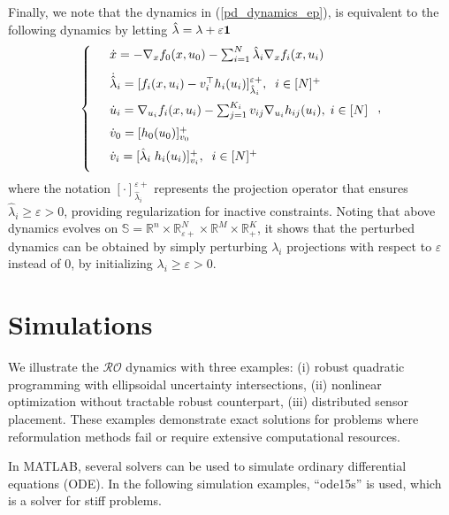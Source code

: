 \documentclass[journal,twoside,web]{ieeecolor}
\newcommand{\rev}[1]{\textcolor{revisionblue}{#1}}
\begin{document}
Finally, we note that the dynamics in (\ref{pd_dynamics_ep}), is equivalent to the following dynamics by letting $\hat{\lambda}=\lambda+\varepsilon {\bf 1}$
\begin{align} \label{pd_dynamics_0}
\left\{
\begin{array}{cl}
\vspace{3mm}
&\dot x=-\nabla_x f_0(x,u_0)-\sum_{i=1}^N\hat{\lambda}_i \nabla_x f_i(x,u_i)\\
\vspace{2mm}
&\dot{\hat{\lambda}}_i=[f_i(x,u_i)-v_i^\top h_i(u_i)]_{\hat{\lambda}_i}^{\varepsilon +},\;\; i\in[N]^+\\
\vspace{2mm}
&\dot u_i=\nabla_{u_i}f_i(x,u_i)-\sum_{j=1}^{K_i} v_{ij} \nabla_{u_i} h_{ij}(u_i),\; i\in[N]\\
\vspace{2mm}
&\dot{v}_0=[h_0(u_0)]_{v_0}^+\\
\vspace{2mm}
&\dot v_i=[\hat{\lambda}_i \; h_i(u_i)]_{v_i}^+,\;\;i\in[N]^+
\end{array}\right.,
\end{align}
\rev{where the notation $[\cdot]_{\hat{\lambda}_i}^{\varepsilon+}$ represents the projection operator that ensures $\hat{\lambda}_i \geq \varepsilon > 0$, providing regularization for inactive constraints.}
Noting that above dynamics evolves on $\mathbb{S}= \mathbb{R}^n \times \mathbb{R}^N_{\varepsilon +} \times \mathbb{R}^M \times \mathbb{R}^K_+$, it shows that the perturbed dynamics can be obtained by simply perturbing $\lambda_i$ projections with respect to $\varepsilon$ instead of $0$, by initializing $\lambda_i \geq \varepsilon > 0$.


\section{Simulations}\label{section_simulations}



We illustrate the $\mathcal{RO}$ dynamics with three examples: (i) robust quadratic programming with ellipsoidal uncertainty intersections, (ii) nonlinear optimization without tractable robust counterpart, (iii) distributed sensor placement. These examples demonstrate exact solutions for problems where reformulation methods fail or require extensive computational resources.

In MATLAB, several solvers can be used to simulate ordinary differential equations (ODE). In the following simulation examples, ``ode15s'' is used, which is a solver for stiff problems.
\end{document}
